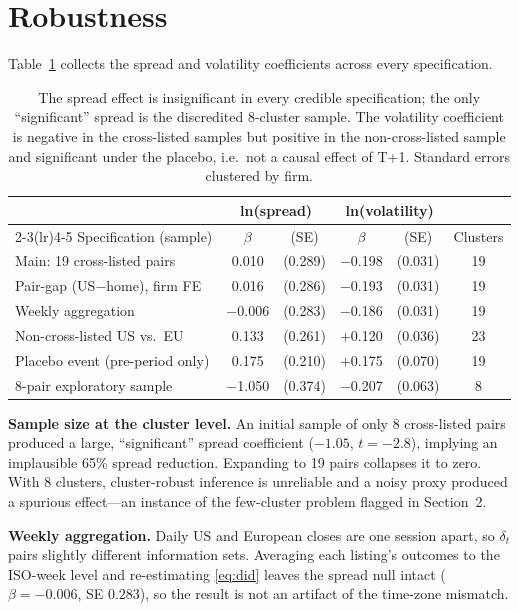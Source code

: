 \documentclass[11pt]{article}
\begin{document}
\section{Robustness}\label{sec:robust}
Table~\ref{tab:robust} collects the spread and volatility coefficients across every specification.

\begin{table}[h]\centering
\caption{Robustness: the coefficient of interest across specifications}
\label{tab:robust}
\begin{tabular}{lccccc}
\toprule
 & \multicolumn{2}{c}{ln(spread)} & \multicolumn{2}{c}{ln(volatility)} & \\
\cmidrule(lr){2-3}\cmidrule(lr){4-5}
Specification (sample) & $\beta$ & (SE) & $\beta$ & (SE) & Clusters \\
\midrule
Main: 19 cross-listed pairs         & 0.010  & (0.289) & $-$0.198 & (0.031) & 19 \\
Pair-gap (US$-$home), firm FE       & 0.016  & (0.286) & $-$0.193 & (0.031) & 19 \\
Weekly aggregation                  & $-$0.006 & (0.283) & $-$0.186 & (0.031) & 19 \\
Non-cross-listed US vs.\ EU         & 0.133  & (0.261) & $+$0.120 & (0.036) & 23 \\
Placebo event (pre-period only)     & 0.175  & (0.210) & $+$0.175 & (0.070) & 19 \\
8-pair exploratory sample           & $-$1.050 & (0.374) & $-$0.207 & (0.063) & 8 \\
\bottomrule
\end{tabular}
\caption*{\footnotesize The spread effect is insignificant in every credible
specification; the only ``significant'' spread is the discredited 8-cluster
sample. The volatility coefficient is negative in the cross-listed samples but
positive in the non-cross-listed sample and significant under the placebo,
i.e.\ not a causal effect of T+1. Standard errors clustered by firm.}
\end{table}

\textbf{Sample size at the cluster level.} An initial sample of only 8 cross-listed
pairs produced a large, ``significant'' spread coefficient ($-1.05$, $t=-2.8$),
implying an implausible 65\% spread reduction. Expanding to 19 pairs collapses it
to zero. With 8 clusters, cluster-robust inference is unreliable and a noisy proxy
produced a spurious effect---an instance of the few-cluster problem
flagged in Section~2.

\textbf{Weekly aggregation.} Daily US and European closes are one session apart, so
$\delta_t$ pairs slightly different information sets. Averaging each listing's
outcomes to the ISO-week level and re-estimating \eqref{eq:did} leaves the spread
null intact ($\beta=-0.006$, SE $0.283$), so the result is not an artifact of the
time-zone mismatch.
\end{document}
